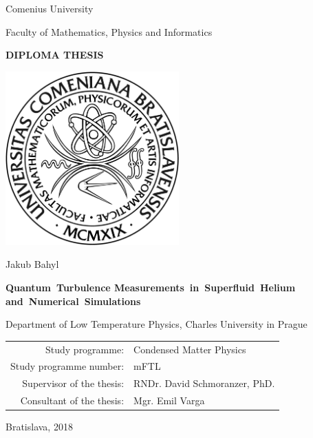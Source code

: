 \begin{center}
	\large\sf
	Comenius University

	Faculty of Mathematics, Physics and Informatics
	
	\bigskip

	{
		\Large \bfseries \sffamily 
		DIPLOMA THESIS
	}
	
	\vspace*{10mm}

	\includegraphics[width=0.5\textwidth]{graphics/fmfi_logo.jpg} 

	\vfill
	\vspace*{5mm}

	{
		\LARGE\sf 
		Jakub Bahyl
	}

	\vspace*{5mm}

	{
		\LARGE \bfseries \sffamily
		\mbox{Quantum Turbulence}
		\mbox{Measurements in Superfluid Helium}
		\mbox{and Numerical Simulations}
	}

	\vfill

	Department of Low Temperature Physics, Charles University in Prague

	\vfill

	\begin{tabular}{rl}

	Study programme: & Condensed Matter Physics \\
	\noalign{\vspace{1mm}}
	Study programme number: & mFTL \\
	\noalign{\vspace{1mm}}
	Supervisor of the thesis: & RNDr. David Schmoranzer, PhD. \\
	\noalign{\vspace{1mm}}
	Consultant of the thesis: & Mgr. Emil Varga \\

	\end{tabular}

	\vfill

	{
		\Large\sf Bratislava, 2018
	}

\end{center}

\newpage